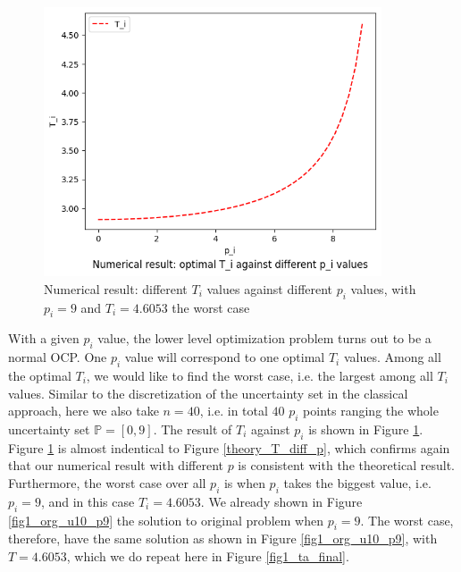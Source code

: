 \documentclass  [
  paper    = a4,
  BCOR     = 10mm,
  twoside,
  fontsize = 12pt,
  fleqn,
  toc      = bibnumbered,
  toc      = listofnumbered,
  numbers  = noendperiod,
  headings = normal,
  listof   = leveldown,
  version  = 3.03
]                                       {scrreprt}
\newcommand{\<}{\langle}
\renewcommand{\>}{\rangle}
\begin{document}
\begin{figure}[H]
	\centerline{\includegraphics[width=10cm]{numerical_T_p.png}}
	\caption{Numerical result: different $T_i$ values against different $p_i$ values, with $p_i=9$ and  $T_i=4.6053$ the worst case}
	\label{fig_ta_numerical_T_p}
\end{figure}

With a given $p_i$ value, the lower level optimization problem turns out to be a normal OCP. One $p_i$ value will correspond to one optimal $T_i$ values. Among all the optimal $T_i$, we would like to find the worst case, i.e. the largest among all $T_i$ values. Similar to the discretization of the uncertainty set in the classical approach, here we also take $n=40$, i.e. in total $40$ $p_i$ points ranging the whole uncertainty set $\mathbb{P}=[0,9]$.  The result of $T_i$ against $p_i$ is shown in Figure \ref{fig_ta_numerical_T_p}.  Figure \ref{fig_ta_numerical_T_p} is almost indentical to Figure \ref{theory_T_diff_p}, which confirms again that our numerical result with different $p$ is consistent with the theoretical result. Furthermore, the worst case over all $p_i$ is when $p_i$ takes the biggest value, i.e. $p_i =9$, and in this case $T_i = 4.6053$.  We already shown in Figure \ref{fig1_org_u10_p9} the solution to original problem when $p_i=9$. The worst case, therefore, have the same solution as shown in Figure \ref{fig1_org_u10_p9}, with  $T=4.6053$, which we do repeat here in Figure \ref{fig1_ta_final}. 
\end{document}
